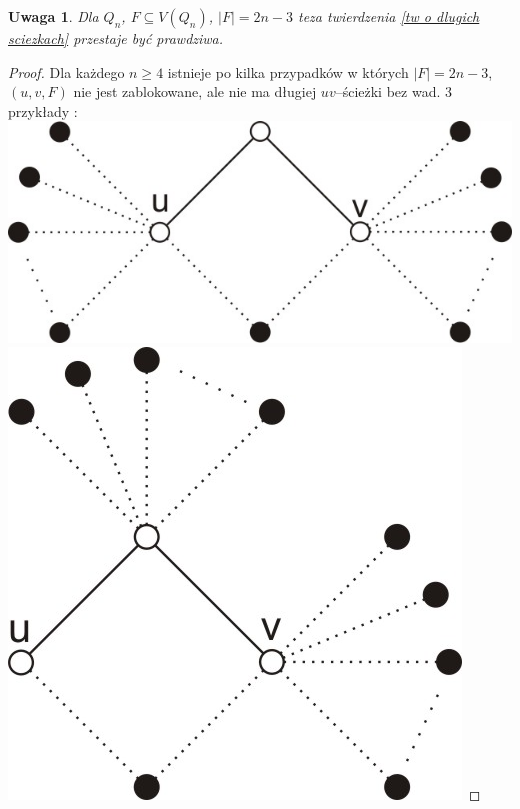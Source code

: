 \documentclass{pracamgr}
\newtheorem{remark}[theorem]{Uwaga}
\begin{document}
   \begin{remark}\label{dluga sciezka 2n-3 za duzo}
    Dla $Q_n$, $F\subseteq V(Q_n)$, $|F|=2n-3$ teza twierdzenia \ref{tw o dlugich sciezkach} przestaje być prawdziwa.
   \end{remark}
   \begin{proof}
   Dla każdego $n\ge 4$ istnieje po kilka przypadków w których $|F|=2n-3$, $(u,v,F)$ nie jest zablokowane, ale nie ma długiej $uv$--ścieżki bez wad.
   3 przykłady :\newline
   \includegraphics{img/Q_niezablokowane_1.jpg}\quad\quad\quad
   \includegraphics{img/Q_niezablokowane_2.jpg}\quad\quad\quad

\end{proof}
\end{document}
